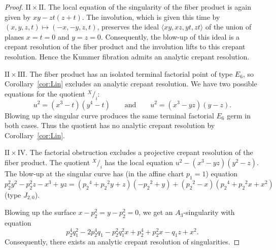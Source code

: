 \documentclass[a4paper]{amsart}
\theoremstyle{plain}
\theoremstyle{definition}
\theoremstyle{remark}
\numberwithin{equation}{section}
\newcommand*\quot[2]{{^{\textstyle #1}\big/_{\textstyle #2}}}
\begin{document}
\begin{proof}
\vspace{2mm}
\medskip
\noindent\emph{$\mathrm{II} \times \mathrm{II}$}.
The local equation of the singularity of the fiber product is again given by $xy-zt(z+t)$.
The involution, which is given this time by $(x,y,z,t)\longmapsto (-x,-y,z,t)$, preserves the ideal $\langle xy,xz, yt, zt\rangle$ of the union of planes $x=t=0$ and $y=z=0$. Consequently, the blow-up of this ideal is a crepant resolution of the fiber product and the involution lifts to this crepant resolution.
Hence the Kummer fibration admits an analytic crepant resolution.

\vspace{2mm}
\medskip
\noindent\emph{$\mathrm{II} \times \mathrm{III}$}.
The fiber product has an isolated terminal factorial point of type $E_6$,
so Corollary~\ref{cor:Lin} excludes an analytic
crepant resolution. We have two possible equations for the quotient $\quot{X}{i}$:
	\[
u^{2} = (x^{3}-t)(y^{4}-t)\qquad\text{and}\qquad u^{2}=(x^{3}-yz)(y-z).
\]
Blowing up the singular curve produces the same terminal factorial
$E_6$ germ in both cases.  Thus the quotient has no analytic crepant
resolution by Corollary~\ref{cor:Lin}.

\vspace{2mm}
\medskip
\noindent\emph{$\mathrm{II} \times \mathrm{IV}$}.
The factorial obstruction excludes a projective crepant resolution of the
fiber product.  The quotient $\quot{X}{i}$ has the local equation $u^{2}-(x^{3}-yz)(y^{2}-z)$. The blow-up at the singular curve has (in the affine chart $p_{1}=1$) equation \[
p_{2}^{2}y^{2}-p_{2}^{2}z-x^{3}+yz = \left(\mathit{p_{2}}^{4}+\mathit{p_{2}}^{2} y +z \right) \left(-\mathit{p_{2}}^{2}+y \right)+\left(\mathit{p_{2}}^{2}-x \right) \left(\mathit{p_{2}}^{4}+\mathit{p_{2}}^{2} x +x^{2}\right)
\]
(type $J_{2,0}$).

Blowing up the surface $x-p_{2}^{2}=y-p_{2}^{2}=0$, we get an $A_{3}$-singularity with equation
\[
p_{2}^{4} q_{1}^{2}-2 p_{2}^{4} q_{1} -p_{2}^{2} q_{1}^{2} x +p_{2}^{4}+p_{2}^{2} x -q_{1} z +x^{2}.
\] Consequently, there exists an analytic crepant resolution of singularities.


\end{proof}
\end{document}
